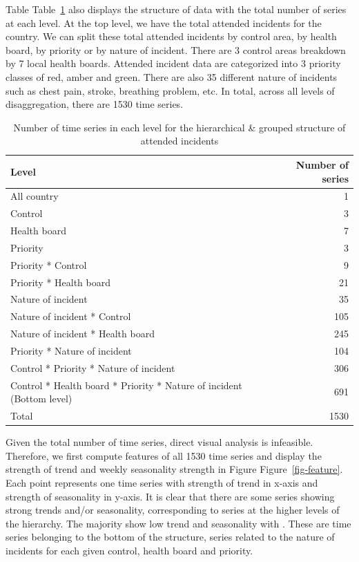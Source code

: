 \documentclass[
  authoryear,
  preprint,
  3p]{elsarticle}
\begin{document}
Table Table~\ref{tbl-hierarchy} also displays the structure of data with
the total number of series at each level. At the top level, we have the
total attended incidents for the country. We can split these total
attended incidents by control area, by health board, by priority or by
nature of incident. There are 3 control areas breakdown by 7 local
health boards. Attended incident data are categorized into 3 priority
classes of red, amber and green. There are also 35 different nature of
incidents such as chest pain, stroke, breathing problem, etc. In total,
across all levels of disaggregation, there are 1530 time series.

\hypertarget{tbl-hierarchy}{}
\begin{table}
\caption{\label{tbl-hierarchy}Number of time series in each level for the hierarchical \& grouped
structure of attended incidents }\tabularnewline

\centering
\begin{tabular}{lr}
\toprule
Level & Number of series\\
\midrule
All country & 1\\
Control & 3\\
Health board & 7\\
Priority & 3\\
Priority * Control & 9\\
\addlinespace
Priority * Health board & 21\\
Nature of incident & 35\\
Nature of incident * Control & 105\\
Nature of incident * Health board & 245\\
Priority * Nature of incident & 104\\
\addlinespace
Control * Priority * Nature of incident & 306\\
Control * Health board * Priority * Nature of incident (Bottom level) & 691\\
Total & 1530\\
\bottomrule
\end{tabular}
\end{table}

Given the total number of time series, direct visual analysis is
infeasible. Therefore, we first compute features of all 1530 time series
and display the strength of trend and weekly seasonality strength in
Figure Figure~\ref{fig-feature}. Each point represents one time series
with strength of trend in x-axis and strength of seasonality in y-axis.
It is clear that there are some series showing strong trends and/or
seasonality, corresponding to series at the higher levels of the
hierarchy. The majority show low trend and seasonality with . These are
time series belonging to the bottom of the structure, series related to
the nature of incidents for each given control, health board and
priority.
\end{document}
